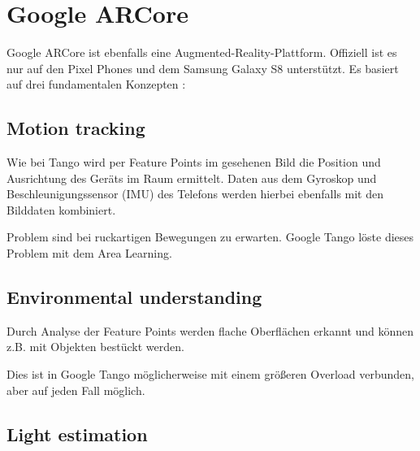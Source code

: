
\section{Google ARCore}
Google ARCore ist ebenfalls eine Augmented-Reality-Plattform. Offiziell ist es nur auf den Pixel Phones und dem Samsung Galaxy S8 unterstützt. Es basiert auf drei fundamentalen Konzepten \cite{arcore_overview}:

\subsection{Motion tracking} Wie bei Tango wird per Feature Points im gesehenen Bild die Position und Ausrichtung des Geräts im Raum ermittelt. Daten aus dem Gyroskop und Beschleunigungssensor (IMU) des Telefons werden hierbei ebenfalls mit den Bilddaten kombiniert. \cite{arcore_fundamentals}\par
Problem sind bei ruckartigen Bewegungen zu erwarten. Google Tango löste dieses Problem mit dem Area Learning.

\subsection{Environmental understanding} Durch Analyse der Feature Points werden flache Oberflächen erkannt und können z.B. mit Objekten bestückt werden. \cite{arcore_fundamentals}\par
Dies ist in Google Tango möglicherweise mit einem größeren Overload verbunden, aber auf jeden Fall möglich. %

\subsection{Light estimation} \cite{arcore_fundamentals}
